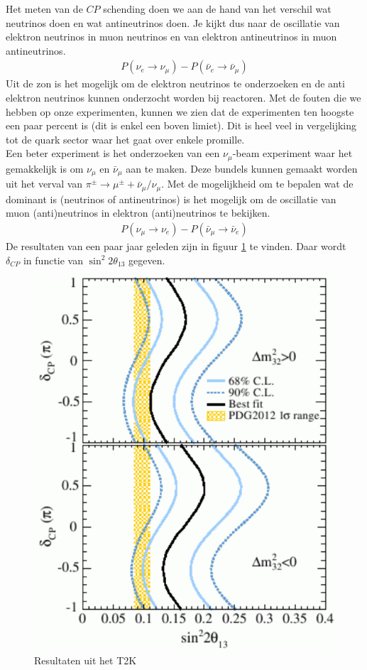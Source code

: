 \documentclass[../main.tex]{subfiles}
\begin{document}
Het meten van de $CP$ schending doen we aan de hand van het verschil wat neutrinos doen en wat antineutrinos doen. Je kijkt dus naar de oscillatie van elektron neutrinos in muon neutrinos en van elektron antineutrinos in muon antineutrinos.
\begin{equation}
    \begin{aligned}
        \label{eq:cp_schending_neutrinos_1}
        P\left(\nu_{e} \rightarrow \nu_{\mu}\right)-P\left(\bar{\nu}_{e} \rightarrow \bar{\nu}_{\mu}\right)
    \end{aligned}
\end{equation}
Uit de zon is het mogelijk om de elektron neutrinos te onderzoeken en de anti elektron neutrinos kunnen onderzocht worden bij reactoren. Met de fouten die we hebben op onze experimenten, kunnen we zien dat de experimenten ten hoogste een paar percent is (dit is enkel een boven limiet). Dit is heel veel in vergelijking tot de quark sector waar het gaat over enkele promille.\\
Een beter experiment is het onderzoeken van een $\nu_\mu$-beam experiment waar het gemakkelijk is om $\nu_\mu$ en $\bar{\nu}_\mu$ aan te maken. Deze bundels kunnen gemaakt worden uit het verval van $\pi^\pm \rightarrow \mu^\pm + \bar{\nu}_\mu/\nu_\mu$. Met de mogelijkheid om te bepalen wat de dominant is (neutrinos of antineutrinos) is het mogelijk om de oscillatie van muon (anti)neutrinos in elektron (anti)neutrinos te bekijken.
\begin{equation}
    \begin{aligned}
        \label{eq:cp_schending_neutrinos_2}
        P\left(\nu_{\mu} \rightarrow \nu_{e}\right)-P\left(\bar{\nu}_{\mu} \rightarrow \bar{\nu}_{e}\right)
    \end{aligned}
\end{equation}
De resultaten van een paar jaar geleden zijn in figuur \ref{fig:neutrinos/t2k} te vinden. Daar wordt $\delta_{CP}$ in functie van $\sin ^{2} 2 \theta_{13}$ gegeven.

\begin{figure}[h]
    \centering
    \includegraphics[width=0.4\linewidth]{neutrinos/t2k.png}
    \caption{Resultaten uit het T2K}%
    \label{fig:neutrinos/t2k}
\end{figure}
\end{document}

